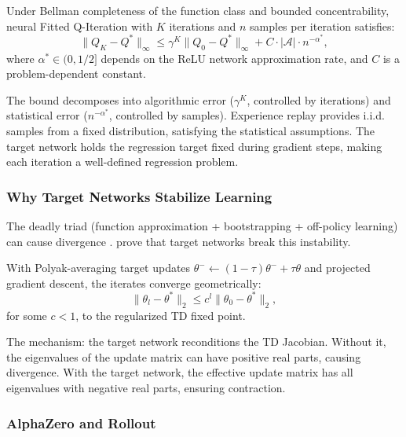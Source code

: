 \begin{theorem}
\label{thm:dqn_convergence}
Under Bellman completeness of the function class and bounded concentrability, neural Fitted Q-Iteration with $K$ iterations and $n$ samples per iteration satisfies:
\begin{equation}
\|Q_K - Q^*\|_\infty \leq \gamma^K \|Q_0 - Q^*\|_\infty + C \cdot |\mathcal{A}| \cdot n^{-\alpha^*},
\end{equation}
where $\alpha^* \in (0, 1/2]$ depends on the ReLU network approximation rate, and $C$ is a problem-dependent constant.
\end{theorem}

The bound decomposes into algorithmic error ($\gamma^K$, controlled by iterations) and statistical error ($n^{-\alpha^*}$, controlled by samples). Experience replay provides i.i.d. samples from a fixed distribution, satisfying the statistical assumptions. The target network holds the regression target fixed during gradient steps, making each iteration a well-defined regression problem.


\subsubsection{Why Target Networks Stabilize Learning}

The deadly triad (function approximation + bootstrapping + off-policy learning) can cause divergence \citep{Baird1995}. \citet{zhang2021target} prove that target networks break this instability.

\begin{theorem}
\label{thm:target_network}
With Polyak-averaging target updates $\theta^- \leftarrow (1-\tau)\theta^- + \tau\theta$ and projected gradient descent, the iterates converge geometrically:
\begin{equation}
\|\theta_l - \theta^*\|_2 \leq c^l \|\theta_0 - \theta^*\|_2,
\end{equation}
for some $c < 1$, to the regularized TD fixed point.
\end{theorem}

The mechanism: the target network reconditions the TD Jacobian. Without it, the eigenvalues of the update matrix can have positive real parts, causing divergence. With the target network, the effective update matrix has all eigenvalues with negative real parts, ensuring contraction.


\subsubsection{AlphaZero and Rollout}

